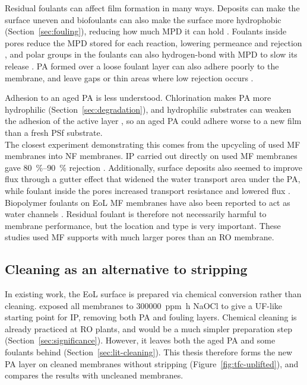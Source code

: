 Residual foulants can affect film formation in many ways. Deposits can make the surface uneven and biofoulants can also make the surface more hydrophobic (Section~\ref{sec:fouling}), reducing how much MPD it can hold \citep{Huang2022}. Foulants inside pores reduce the MPD stored for each reaction, lowering permeance and rejection \citep{Huang2022}, and polar groups in the foulants can also hydrogen-bond with MPD to slow its release \citep{GhoshHoek2009}. PA formed over a loose foulant layer can also adhere poorly to the membrane, and leave gaps or thin areas where low rejection occurs \citep{Singh2006}.

Adhesion to an aged PA is less understood. Chlorination makes PA more hydrophilic (Section~\ref{sec:degradation}), and hydrophilic substrates can weaken the adhesion of the active layer \citep{Ismail2015}, so an aged PA could adhere worse to a new film than a fresh PSf substrate. \\

The closest experiment demonstrating this comes from the upcycling of used MF membranes into NF membranes. IP carried out directly on used MF membranes gave \qtyrange{80}{90}{\percent}  rejection \citep{Khanzada2024}. Additionally, surface deposits also seemed to improve flux through a gutter effect that widened the water transport area under the PA, while foulant inside the pores increased transport resistance and lowered flux \citep{Khanzada2024}. Biopolymer foulants on EoL MF membranes have also been reported to act as water channels \citep{LejarazuLarranaga2022}. Residual foulant is therefore not necessarily harmful to membrane performance, but the location and type is very important. These studies used MF supports with much larger pores than an RO membrane.




\subsection{Cleaning as an alternative to stripping}
\label{sec:substrate-prep}
In existing work, the EoL surface is prepared via chemical conversion rather than cleaning. \citet{Ogbe2025} exposed all membranes to \qty{300000}{ppm.h} NaOCl to give a UF-like starting point for IP, removing both PA and fouling layers. Chemical cleaning is already practiced at RO plants, and would be a much simpler preparation step (Section~\ref{sec:significance}). However, it leaves both the aged PA and some foulants behind (Section~\ref{sec:lit-cleaning}). This thesis therefore forms the new PA layer on cleaned membranes without stripping (Figure~\ref{fig:tfc-uplifted}), and compares the results with uncleaned membranes. 


